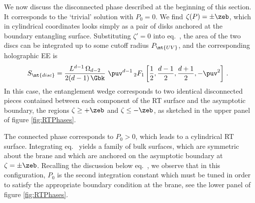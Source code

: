 We now discuss the disconnected phase described at the beginning of this section. It corresponds to the `trivial' solution with $P_0=0$. We find $\zeta(P)=\pm\zeb$, which in cylindrical coordinates looks simply as a pair of disks anchored at the boundary entangling surface. Substituting $\zeta'=0$ into eq.~, the area of the two discs can be integrated up to some cutoff radius $P_\mt{UV}$, and the corresponding holographic EE is
\begin{align}\label{A_disc}
S_\mt{disc}=\frac{L^{d-1}\, \Omega_{d-2}}{2(d-1)\,\Gbk} \ \puv^{d-1}\, {}_{2}F_1\left[ \frac{1}{2},\frac{d-1}{2},\frac{d+1}{2},-\puv^2 \right]\,.
\end{align}
In this case, the entanglement wedge corresponds to two identical disconnected pieces contained between each component of the RT surface and the asymptotic boundary, \ie the regions $\zeta\ge+\zeb$ and $\zeta\le-\zeb$, as sketched in the upper panel of figure \ref{fig:RTPhases}. 
%


\begin{figure}
	\def\svgwidth{0.8\linewidth}
\end{figure}

The connected phase corresponds to $P_0>0$, which leads to a cylindrical RT surface. Integrating eq.~ yields a family of bulk surfaces, which are symmetric about the brane and which are anchored on the asymptotic boundary at $\zeta=\pm\zeb$. Recalling the discussion below eq.~, we observe that in this configuration, $P_0$ is the second integration constant which must be tuned in order to satisfy the appropriate boundary condition  at the brane, see the lower panel of figure \ref{fig:RTPhases}.


